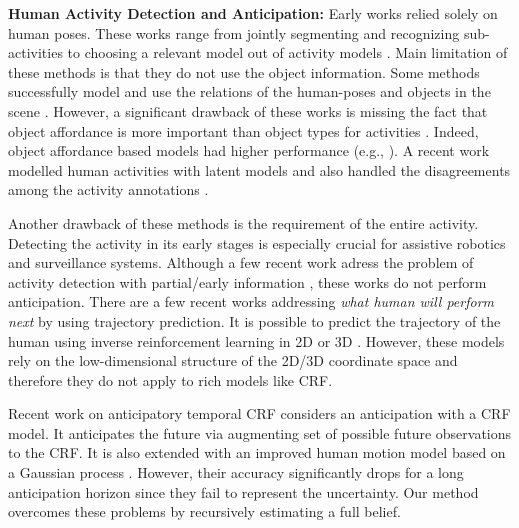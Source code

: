 \noindent
{\bf Human Activity Detection and Anticipation:} Early works relied solely on human poses. These works range from jointly segmenting and recognizing sub-activities \cite{hoai2011,shi2011} to choosing a relevant model out of activity models \cite{pyry2012}. Main limitation of these methods is that they do not use the object information. Some methods successfully model and use the relations of the human-poses and objects in the scene \cite{davis2009,feifei2010,jiang2012,hall}. However, a significant drawback of these works is missing the fact that object affordance is more important than object types for activities \cite{gibson1979}. Indeed, object affordance based models had higher performance (e.g., \cite{hemaIJRR}). A recent work modelled human activities with latent models \cite{latentIcra} and also handled the disagreements among the activity annotations \cite{rss2014}.

Another drawback of these methods is the requirement of the entire activity. Detecting the activity in its early stages is especially crucial for assistive robotics and surveillance systems. Although a few recent work adress the problem of activity detection with partial/early information \cite{torre2012,ryoo2011}, these works do not perform anticipation. There are a few recent works addressing \emph{what human will perform next} by using trajectory prediction. It is possible to predict the trajectory of the human  using inverse reinforcement learning in 2D \cite{ziebart2009,kuderer2012,kitani2012} or 3D \cite{dragan2012}. However, these models rely on the low-dimensional structure of the 2D/3D coordinate space and therefore they do not apply to rich models like CRF.

Recent work on anticipatory temporal CRF \cite{hemaAnt} considers an anticipation with a CRF model. It anticipates the future via augmenting set of possible future observations to the CRF. It is also extended with an improved human motion model based on a Gaussian process \cite{gpcrf}. However, their accuracy significantly drops for a long anticipation horizon since they fail to represent the uncertainty. Our method overcomes these problems by recursively estimating a full belief.
